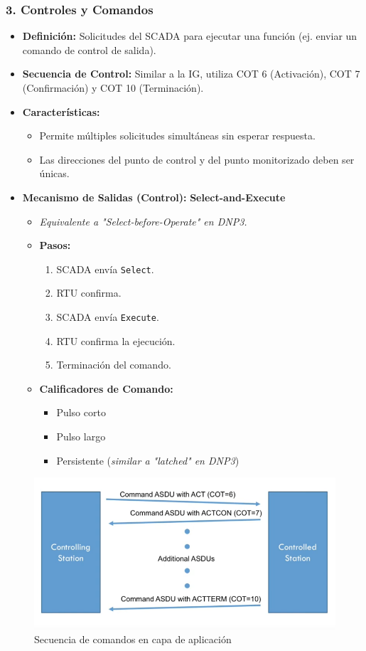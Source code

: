 \documentclass[a5paper]{book}%
\begin{document}
\subsubsection*{3. Controles y Comandos}
\begin{itemize}
	\item \textbf{Definición:} Solicitudes del SCADA para ejecutar una función (ej. enviar un comando de control de salida).
	\item \textbf{Secuencia de Control:} Similar a la IG, utiliza COT 6 (Activación), COT 7 (Confirmación) y COT 10 (Terminación).
	\item \textbf{Características:}
	\begin{itemize}
		\item Permite múltiples solicitudes simultáneas sin esperar respuesta.
		\item Las direcciones del punto de control y del punto monitorizado deben ser únicas.
	\end{itemize}
	\item \textbf{Mecanismo de Salidas (Control):} \textbf{Select-and-Execute}
	\begin{itemize}
		\item \textit{Equivalente a "Select-before-Operate" en DNP3.}
		\item \textbf{Pasos:}
		\begin{enumerate}
			\item SCADA envía \texttt{Select}.
			\item RTU confirma.
			\item SCADA envía \texttt{Execute}.
			\item RTU confirma la ejecución.
			\item Terminación del comando.
		\end{enumerate}
		\item \textbf{Calificadores de Comando:}
		\begin{itemize}
			\item Pulso corto
			\item Pulso largo
			\item Persistente (\textit{similar a "latched" en DNP3})
		\end{itemize}
	\end{itemize}
\end{itemize}

\begin{figure}[H]
	\centering
	\caption{Secuencia de comandos en capa de aplicación}
	\label{fig:comandos104}
	\includegraphics[width=1\linewidth]{comandos_104}
\end{figure}
\end{document}
